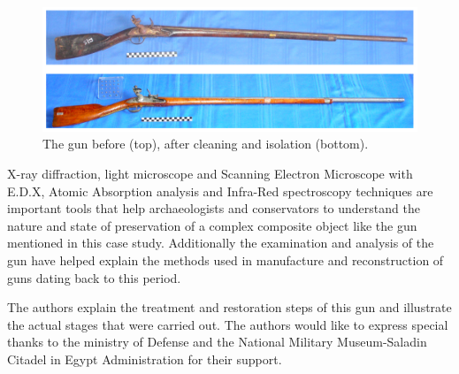 \begin{figure}[!htb]
	\centering
	\includegraphics[height=.55\linewidth,angle=90]{figures/zidan_Fig10}
	\caption{The gun before (top), after cleaning and isolation (bottom).}
	\label{fig:Fig10}
\end{figure}
X-ray diffraction, light microscope and Scanning Electron Microscope with E.D.X, Atomic Absorption analysis and Infra-Red spectroscopy techniques are important tools that help archaeologists and conservators to understand the nature and state of preservation of a complex composite object like the gun mentioned in this case study. Additionally the examination and analysis of the gun have helped explain the methods used in manufacture and reconstruction of guns dating back to this period. 

The authors explain the treatment and restoration steps of this gun and illustrate the actual stages that were carried out. 
\myseparator
The authors would like to express special thanks to the ministry of Defense and the National Military Museum-Saladin Citadel in Egypt Administration for their support. 


\printbibliography[heading=subbibnumbered] 
\label{zidan:lastpage}
\closingarticle
